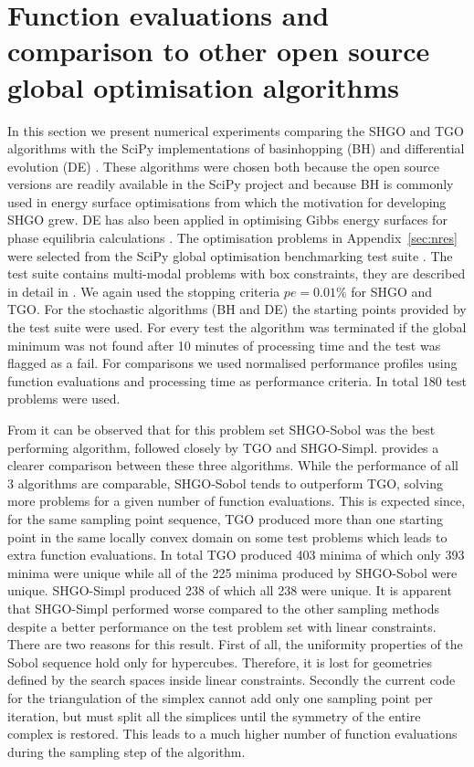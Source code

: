 \section{Function evaluations and comparison to other open source global optimisation algorithms}
In this section we present numerical experiments comparing the SHGO and TGO algorithms with the SciPy implementations \citep{scipy} of basinhopping (BH) \citep{li1987monte, wales2003energy, wales1997global, wales1999global} and differential evolution (DE) \citep{Storn1997}. These algorithms were chosen both because the open source versions are readily available in the SciPy project and because BH is commonly used in energy surface optimisations \citep{Wales2015} from which the motivation for developing SHGO grew. DE has also been applied in optimising Gibbs energy surfaces for phase equilibria calculations \citep{Zhang2011}. The optimisation problems in Appendix~\ref{sec:nres} were selected from the SciPy global optimisation benchmarking test suite \citep{Adorio2005, Gavana2016, Jamil2013, Mishra2007, Mishra2006, NIST2016}. The test suite contains multi-modal problems with box constraints, they are described in detail in \citet{Gavana2016}. We again used the stopping criteria $pe = 0.01\%$ for SHGO and TGO. For the stochastic algorithms (BH and DE) the starting points provided by the test suite were used. For every test the algorithm was terminated if the global minimum was not found after 10 minutes of processing time and the test was flagged as a fail. For comparisons we used normalised performance profiles \citep{Dolan2002} using function evaluations and processing time as performance criteria. In total 180 test problems were used.

From  it can be observed that for this problem set SHGO-Sobol was the best performing algorithm, followed closely by TGO and SHGO-Simpl.  provides a clearer comparison between these three algorithms. While the performance of all 3 algorithms are comparable, SHGO-Sobol tends to outperform TGO, solving more problems for a given number of function evaluations. This is expected since, for the same sampling point sequence, TGO produced more than one starting point in the same locally convex domain on some test problems which leads to extra function evaluations. In total TGO produced 403 minima of which only 393 minima were unique while all of the 225 minima produced by SHGO-Sobol were unique. SHGO-Simpl produced 238 of which all 238 were unique. It is apparent that SHGO-Simpl performed worse compared to the other sampling methods despite a better performance on the test problem set with linear constraints. There are two reasons for this result. First of all, the uniformity properties of the Sobol sequence hold only for hypercubes. Therefore, it is lost for geometries defined by the search spaces inside linear constraints. Secondly the current code for the triangulation of the simplex cannot add only one sampling point per iteration, but must split all the simplices until the symmetry of the entire complex is restored. This leads to a much higher number of function evaluations during the sampling step of the algorithm.

